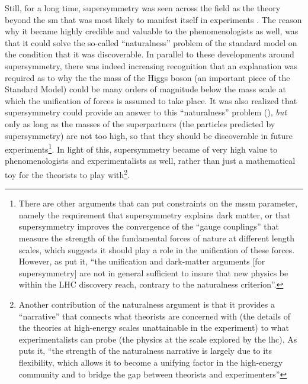 \documentclass[smallextended]{svjour3}
\begin{document}
Still, for a long time, supersymmetry was seen across the field as the theory beyond the \gls{sm} that was most likely to manifest itself in experiments \citep{Mttig2019,Mttig2020a}. The reason why it became highly credible and valuable to the phenomenologists as well, was that it could solve the so-called ``naturalness'' problem of the standard model on the condition that it was discoverable. %
In parallel to these developments around supersymmetry, there was indeed increasing recognition that an explanation was required as to why the the mass of the Higgs boson (an important piece of the Standard Model) could be many orders of magnitude below the mass scale at which the unification of forces is assumed to take place. 
It was also realized that supersymmetry could provide an answer to this ``naturalness''  problem (\citealt{Weinberg1978,Veltman1980,Witten1982de}), \textit{but} only as long as the masses of the superpartners (the particles predicted by supersymmetry) are not too high, so that they should be discoverable in future experiments\footnote{There are other arguments that can put constraints on the \gls{mssm} parameter, namely the requirement that supersymmetry explains dark matter, or that supersymmetry improves the convergence of the ``gauge couplings'' that measure the strength of the fundamental forces of nature at different length scales, which suggests it should play a role in the unification of these forces. However, as \citealt{Giudice2004} put it, ``the unification and dark-matter arguments [for supersymmetry] are not in general sufficient to insure that new physics be within the LHC discovery reach, contrary to the naturalness criterion''.}. In light of this, supersymmetry became of very high value to phenomenologists and experimentalists as well, rather than just a mathematical toy for the theorists to play with\footnote{Another contribution of the naturalness argument is that it provides a ``narrative'' that connects what theorists are concerned with (the details of the theories at high-energy scales unattainable in the experiment) to what experimentalists can probe (the physics at the scale explored by the \gls{lhc}). As \citet[p.~76]{Borrelli2015} puts it, ``the strength of the naturalness narrative is largely due to its flexibility, which allows it to become a unifying factor in the high-energy community and to bridge the gap between theorists and experimenters''  }.
\end{document}
